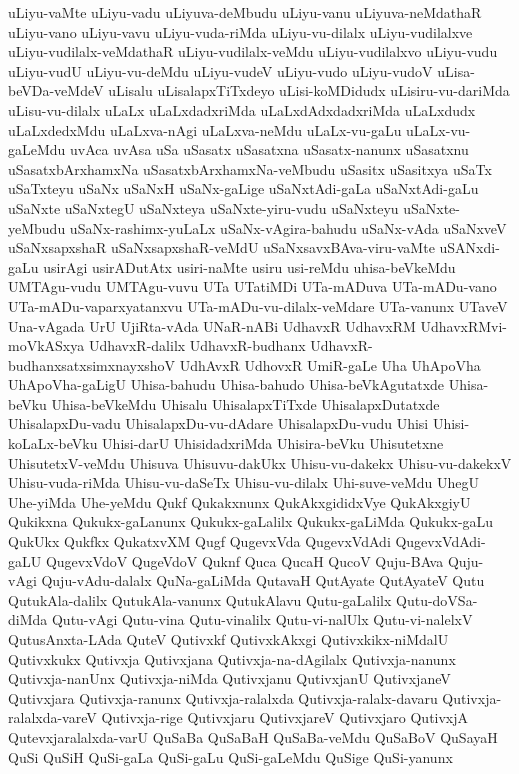 {uLiyu-vaMte
uLiyu-vadu
uLiyuva-deMbudu
uLiyu-vanu
uLiyuva-neMdathaR
uLiyu-vano
uLiyu-vavu
uLiyu-vuda-riMda
uLiyu-vu-dilalx
uLiyu-vudilalxve
uLiyu-vudilalx-veMdathaR
uLiyu-vudilalx-veMdu
uLiyu-vudilalxvo
uLiyu-vudu
uLiyu-vudU
uLiyu-vu-deMdu
uLiyu-vudeV
uLiyu-vudo
uLiyu-vudoV
uLisa-beVDa-veMdeV
uLisalu
uLisalapxTiTxdeyo
uLisi-koMDidudx
uLisiru-vu-dariMda
uLisu-vu-dilalx
uLaLx
uLaLxdadxriMda
uLaLxdAdxdadxriMda
uLaLxdudx
uLaLxdedxMdu
uLaLxva-nAgi
uLaLxva-neMdu
uLaLx-vu-gaLu
uLaLx-vu-gaLeMdu
uvAca
uvAsa
uSa
uSasatx
uSasatxna
uSasatx-nanunx
uSasatxnu
uSasatxbArxhamxNa
uSasatxbArxhamxNa-veMbudu
uSasitx
uSasitxya
uSaTx
uSaTxteyu
uSaNx
uSaNxH
uSaNx-gaLige
uSaNxtAdi-gaLa
uSaNxtAdi-gaLu
uSaNxte
uSaNxtegU
uSaNxteya
uSaNxte-yiru-vudu
uSaNxteyu
uSaNxte-yeMbudu
uSaNx-rashimx-yuLaLx
uSaNx-vAgira-bahudu
uSaNx-vAda
uSaNxveV
uSaNxsapxshaR
uSaNxsapxshaR-veMdU
uSaNxsavxBAva-viru-vaMte
uSANxdi-gaLu
usirAgi
usirADutAtx
usiri-naMte
usiru
usi-reMdu
uhisa-beVkeMdu
UMTAgu-vudu
UMTAgu-vuvu
UTa
UTatiMDi
UTa-mADuva
UTa-mADu-vano
UTa-mADu-vaparxyatanxvu
UTa-mADu-vu-dilalx-veMdare
UTa-vanunx
UTaveV
Una-vAgada
UrU
UjiRta-vAda
UNaR-nABi
UdhavxR
UdhavxRM
UdhavxRMvi-moVkASxya
UdhavxR-dalilx
UdhavxR-budhanx
UdhavxR-budhanxsatxsimxnayxshoV
UdhAvxR
UdhovxR
UmiR-gaLe
Uha
UhApoVha
UhApoVha-gaLigU
Uhisa-bahudu
Uhisa-bahudo
Uhisa-beVkAgutatxde
Uhisa-beVku
Uhisa-beVkeMdu
Uhisalu
UhisalapxTiTxde
UhisalapxDutatxde
UhisalapxDu-vadu
UhisalapxDu-vu-dAdare
UhisalapxDu-vudu
Uhisi
Uhisi-koLaLx-beVku
Uhisi-darU
UhisidadxriMda
Uhisira-beVku
Uhisutetxne
UhisutetxV-veMdu
Uhisuva
Uhisuvu-dakUkx
Uhisu-vu-dakekx
Uhisu-vu-dakekxV
Uhisu-vuda-riMda
Uhisu-vu-daSeTx
Uhisu-vu-dilalx
Uhi-suve-veMdu
UhegU
Uhe-yiMda
Uhe-yeMdu
Qukf
Qukakxnunx
QukAkxgididxVye
QukAkxgiyU
Qukikxna
Qukukx-gaLanunx
Qukukx-gaLalilx
Qukukx-gaLiMda
Qukukx-gaLu
QukUkx
Qukfkx
QukatxvXM
Qugf
QugevxVda
QugevxVdAdi
QugevxVdAdi-gaLU
QugevxVdoV
QugeVdoV
Quknf
Quca
QucaH
QucoV
Quju-BAva
Quju-vAgi
Quju-vAdu-dalalx
QuNa-gaLiMda
QutavaH
QutAyate
QutAyateV
Qutu
QutukAla-dalilx
QutukAla-vanunx
QutukAlavu
Qutu-gaLalilx
Qutu-doVSa-diMda
Qutu-vAgi
Qutu-vina
Qutu-vinalilx
Qutu-vi-nalUlx
Qutu-vi-nalelxV
QutusAnxta-LAda
QuteV
Qutivxkf
QutivxkAkxgi
Qutivxkikx-niMdalU
Qutivxkukx
Qutivxja
Qutivxjana
Qutivxja-na-dAgilalx
Qutivxja-nanunx
Qutivxja-nanUnx
Qutivxja-niMda
Qutivxjanu
QutivxjanU
QutivxjaneV
Qutivxjara
Qutivxja-ranunx
Qutivxja-ralalxda
Qutivxja-ralalx-davaru
Qutivxja-ralalxda-vareV
Qutivxja-rige
Qutivxjaru
QutivxjareV
Qutivxjaro
QutivxjA
Qutevxjaralalxda-varU
QuSaBa
QuSaBaH
QuSaBa-veMdu
QuSaBoV
QuSayaH
QuSi
QuSiH
QuSi-gaLa
QuSi-gaLu
QuSi-gaLeMdu
QuSige
QuSi-yanunx
}
